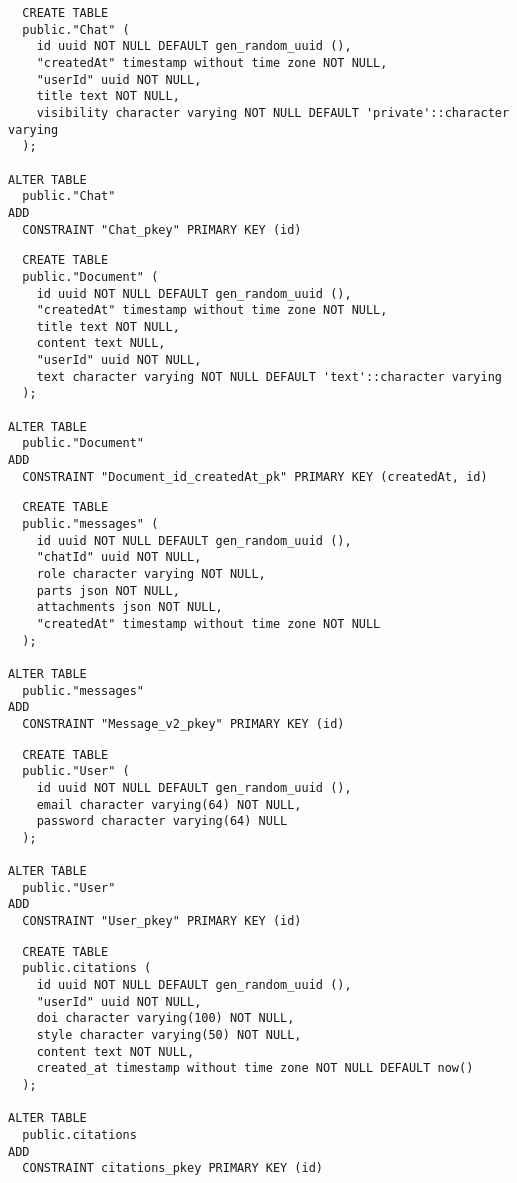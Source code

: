 \begin{verbatim}
  CREATE TABLE
  public."Chat" (
    id uuid NOT NULL DEFAULT gen_random_uuid (),
    "createdAt" timestamp without time zone NOT NULL,
    "userId" uuid NOT NULL,
    title text NOT NULL,
    visibility character varying NOT NULL DEFAULT 'private'::character varying
  );

ALTER TABLE
  public."Chat"
ADD
  CONSTRAINT "Chat_pkey" PRIMARY KEY (id)
\end{verbatim}

\begin{verbatim}
  CREATE TABLE
  public."Document" (
    id uuid NOT NULL DEFAULT gen_random_uuid (),
    "createdAt" timestamp without time zone NOT NULL,
    title text NOT NULL,
    content text NULL,
    "userId" uuid NOT NULL,
    text character varying NOT NULL DEFAULT 'text'::character varying
  );

ALTER TABLE
  public."Document"
ADD
  CONSTRAINT "Document_id_createdAt_pk" PRIMARY KEY (createdAt, id)
\end{verbatim}

\begin{verbatim}
  CREATE TABLE
  public."messages" (
    id uuid NOT NULL DEFAULT gen_random_uuid (),
    "chatId" uuid NOT NULL,
    role character varying NOT NULL,
    parts json NOT NULL,
    attachments json NOT NULL,
    "createdAt" timestamp without time zone NOT NULL
  );

ALTER TABLE
  public."messages"
ADD
  CONSTRAINT "Message_v2_pkey" PRIMARY KEY (id)
\end{verbatim}

\begin{verbatim}
  CREATE TABLE
  public."User" (
    id uuid NOT NULL DEFAULT gen_random_uuid (),
    email character varying(64) NOT NULL,
    password character varying(64) NULL
  );

ALTER TABLE
  public."User"
ADD
  CONSTRAINT "User_pkey" PRIMARY KEY (id)
\end{verbatim}


\begin{verbatim}
  CREATE TABLE
  public.citations (
    id uuid NOT NULL DEFAULT gen_random_uuid (),
    "userId" uuid NOT NULL,
    doi character varying(100) NOT NULL,
    style character varying(50) NOT NULL,
    content text NOT NULL,
    created_at timestamp without time zone NOT NULL DEFAULT now()
  );

ALTER TABLE
  public.citations
ADD
  CONSTRAINT citations_pkey PRIMARY KEY (id)
\end{verbatim}